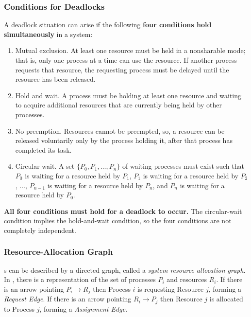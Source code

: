 \subsubsection{Conditions for Deadlocks}\label{subsubsec:Deadlock_Conditions}
A deadlock situation can arise if the following \textbf{four conditions hold simultaneously} in a system:
\begin{enumerate}[noitemsep]
\item Mutual exclusion.
  At least one resource must be held in a nonsharable mode; that is, only one process at a time can use the resource.
  If another process requests that resource, the requesting process must be delayed until the resource has been released.
\item Hold and wait.
  A process must be holding at least one resource and waiting to acquire additional resources that are currently being held by other processes.
\item No preemption.
  Resources cannot be preempted, so, a resource can be released voluntarily only by the process holding it, after that process has completed its task.
\item Circular wait.
  A set $\lbrace P_{0}, P_{1}, \ldots, P_{n} \rbrace$ of waiting processes must exist such that $P_{0}$ is waiting for a resource held by $P_{1}$, $P_{1}$ is waiting for a resource held by $P_{2}$, $\ldots$, $P_{n-1}$ is waiting for a resource held by $P_{n}$, and $P_{n}$ is waiting for a resource held by $P_{0}$.
\end{enumerate}

\textbf{All four conditions must hold for a deadlock to occur.}
The circular-wait condition implies the hold-and-wait condition, so the four conditions are not completely independent.

\subsubsection{Resource-Allocation Graph}\label{subsubsec:Resource_Allocation_Graph}
s can be described by a directed graph, called a \emph{system resource allocation graph}.
In , there is a representation of the set of processes $P_{i}$ and resources $R_{i}$.
If there is an arrow pointing $P_{i} \rightarrow R_{j}$ then Process $i$ is requesting Resource $j$, forming a \emph{Request Edge}.
If there is an arrow pointing $R_{i} \rightarrow P_{j}$ then Resource $j$ is allocated to Process $j$, forming a \emph{Assignment Edge}.

